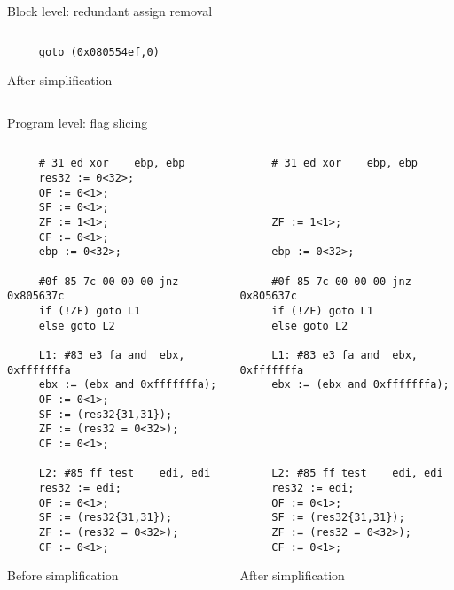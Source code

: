 \begin{frame}[fragile]{Block level: redundant assign removal}
\begin{columns}[t]
\begin{column}[T]{5.5cm}
\begin{lstlisting}
     goto (0x080554ef,0) 
     \end{lstlisting}
     \vspace{-1.1cm}
     \begin{center}
     {\scriptsize After simplification}
     \end{center}
     \end{column}
     \end{columns}
\end{frame}




\begin{frame}[fragile]{Program level: flag slicing}
     \begin{columns}[t]
     \begin{column}[T]{5.5cm}
     \lstset{basicstyle=\tiny, stepnumber=10000}
     \begin{lstlisting}
     # 31 ed xor 	ebp, ebp 
     res32 := 0<32>;
     OF := 0<1>;
     SF := 0<1>;
     ZF := 1<1>;
     CF := 0<1>;
     ebp := 0<32>;

     #0f 85 7c 00 00 00 jnz 	0x805637c 
     if (!ZF) goto L1 
     else goto L2

     L1: #83 e3 fa and 	ebx, 0xfffffffa 
     ebx := (ebx and 0xfffffffa);
     OF := 0<1>;
     SF := (res32{31,31});
     ZF := (res32 = 0<32>);
     CF := 0<1>;

     L2: #85 ff test 	edi, edi 
     res32 := edi;
     OF := 0<1>;
     SF := (res32{31,31});
     ZF := (res32 = 0<32>);
     CF := 0<1>;
     \end{lstlisting}
     \vspace{-1.1cm}
     \begin{center}
     Before simplification
     \end{center}
     \end{column}
     \begin{column}[T]{5.5cm}
     \lstset{basicstyle=\tiny, stepnumber=10000}
     \begin{lstlisting}
     # 31 ed xor 	ebp, ebp 



     ZF := 1<1>;

     ebp := 0<32>;

     #0f 85 7c 00 00 00 jnz 	0x805637c 
     if (!ZF) goto L1 
     else goto L2

     L1: #83 e3 fa and 	ebx, 0xfffffffa 
     ebx := (ebx and 0xfffffffa);





     L2: #85 ff test 	edi, edi 
     res32 := edi;
     OF := 0<1>;
     SF := (res32{31,31});
     ZF := (res32 = 0<32>);
     CF := 0<1>;
     \end{lstlisting}
     \vspace{-1.1cm}
     \begin{center}
     After simplification
     \end{center}
     \end{column}
     \end{columns}
\end{frame}




